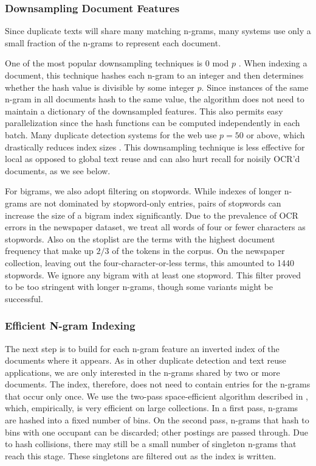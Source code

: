 \documentclass[pdftex,11pt]{article}
\begin{document}
\subsubsection{Downsampling Document Features}
\label{sec:downsampling}

Since duplicate texts will share many matching n-grams, many systems
use only a small fraction of the n-grams to represent each document.

One of the most popular downsampling techniques is 0 mod $p$
\citep{bernstein04:_scalab_system_ident_co_docum}.  When indexing a
document, this technique hashes each n-gram to an integer and then
determines whether the hash value is divisible by some integer $p$.
Since instances of the same n-gram in all documents hash to the same
value, the algorithm does not need to maintain a dictionary of the
downsampled features.  This also permits easy parallelization since
the hash functions can be computed independently in each batch.  Many
duplicate detection systems for the web use $p = 50$ or
above, which drastically reduces index sizes
\citep{henzinger06:_findin_near_duplic_web_pages}.  This downsampling
technique is less effective for local as opposed to global text reuse
\citep{seo08:_local_text_reuse_detec} and can also hurt recall for
noisily OCR'd documents, as we see below.

For bigrams, we also adopt filtering on stopwords.  While indexes of
longer n-grams are not dominated by stopword-only entries, pairs of
stopwords can increase the size of a bigram index significantly.  Due
to the prevalence of OCR errors in the newspaper dataset, we treat all
words of four or fewer characters as stopwords.  Also on the stoplist
are the terms with the highest document frequency that make up $2/3$
of the tokens in the corpus.  On the newspaper collection, leaving out
the four-character-or-less terms, this amounted to 1440 stopwords.  We
ignore any bigram with at least one stopword.  This filter proved to
be too stringent with longer n-grams, though some variants might be
successful.

\subsubsection{Efficient N-gram Indexing}
\label{sec:indexing}

The next step is to build for each n-gram feature an inverted index of
the documents where it appears.  As in other duplicate detection and
text reuse applications, we are only interested in the n-grams shared
by two or more documents.  The index, therefore, does not need to
contain entries for the n-grams that occur only once.  We use the
two-pass space-efficient algorithm described in
\citet{huston11:_effic_index_repeat}, which, empirically, is very
efficient on large collections.  In a first pass, n-grams are hashed
into a fixed number of bins.  On the second pass, n-grams that hash to
bins with one occupant can be discarded; other postings are passed
through.  Due to hash collisions, there may still be a small number of
singleton n-grams that reach this stage.  These singletons are
filtered out as the index is written.
\end{document}
